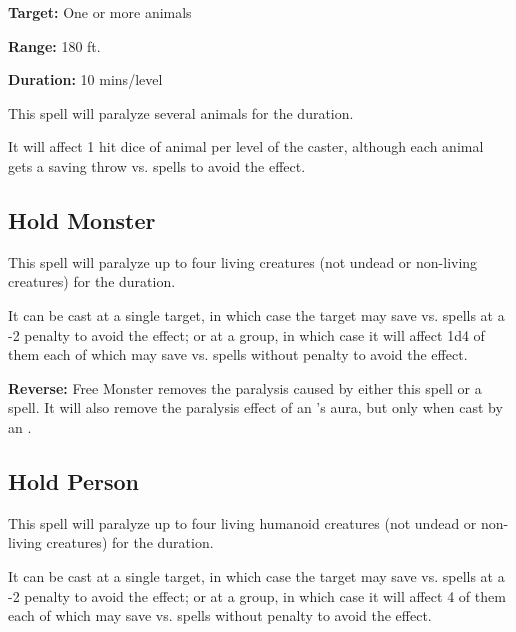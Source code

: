 \begin{multicols*}{2}
{\textbf{Target:} One or more animals

\textbf{Range:} 180 ft.

\textbf{Duration:} 10 mins/level}

This spell will paralyze several animals for the duration.

It will affect 1 hit dice of animal per level of the caster, although each animal gets a saving throw vs. spells to avoid the effect.

\subsection{Hold Monster}\label{spell:Hold Monster}

This spell will paralyze up to four living creatures (not undead or non-living creatures) for the duration.

It can be cast at a single target, in which case the target may save vs. spells at a -2 penalty to avoid the effect; or at a group, in which case it will affect 1d4 of them each of which may save vs. spells without penalty to avoid the effect.

\textbf{Reverse:} \hypertarget{spell:Free Monster}{Free Monster} removes the paralysis caused by either this spell or a  spell. It will also remove the paralysis effect of an ’s aura, but only when cast by an .

\subsection{Hold Person}\label{spell:Hold Person}

This spell will paralyze up to four living humanoid creatures (not undead or non-living creatures) for the duration.

It can be cast at a single target, in which case the target may save vs. spells at a -2 penalty to avoid the effect; or at a group, in which case it will affect 4 of them each of which may save vs. spells without penalty to avoid the effect.


\end{multicols*}
